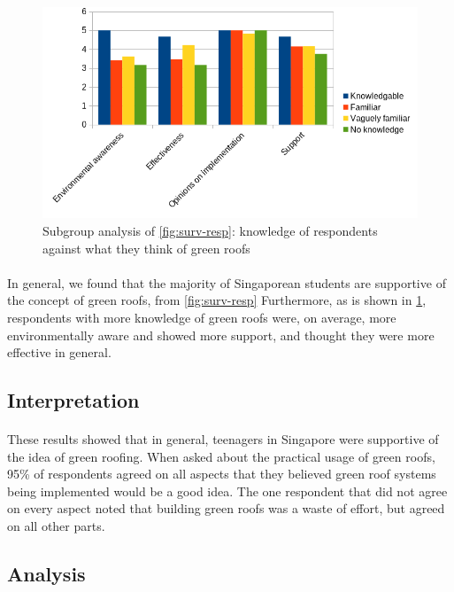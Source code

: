 \documentclass{article}
\begin{document}
\begin{multicols}{2}
  \begin{figure}
    \includegraphics[width=\linewidth]{knowledge-opinions.png}
    \caption{
      Subgroup analysis of \cref{fig:surv-resp}: knowledge of respondents
      against what they think of green roofs
    }
    \label{fig:know-opn}
  \end{figure}

  \paragraph{} In general, we found that the majority of Singaporean
  students are supportive of the concept of green roofs, from
  \cref{fig:surv-resp} Furthermore, as is shown in \cref{fig:know-opn},
  respondents with more knowledge of green roofs were, on average, more
  environmentally aware and showed more support, and thought they were
  more effective in general.


  \subsection{Interpretation}
  \paragraph{} These results showed that in general, teenagers in
  Singapore were supportive of the idea of green roofing. When asked about
  the practical usage of green roofs, 95\% of respondents agreed on all
  aspects that they believed green roof systems being implemented would
  be a good idea. The one respondent that did not agree on every aspect
  noted that building green roofs was a waste of effort, but agreed on
  all other parts. 

  \subsection{Analysis}

\end{multicols}
\end{document}
